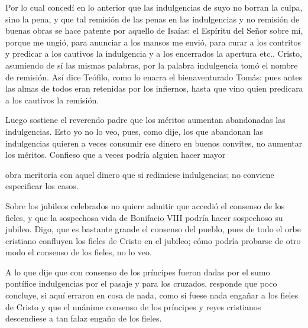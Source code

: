 Por lo cual concedí en lo anterior que las indulgencias de suyo no borran la culpa, sino la pena, y que tal remisión de las penas en las indulgencias y no remisión de buenas obras se hace patente por aquello de Isaías: el Espíritu del Señor sobre mí, porque me ungió, para anunciar a los mansos me envió, para curar a los contritos y predicar a los cautivos la indulgencia y a los encerrados la apertura etc.. Cristo, asumiendo de sí las mismas palabras, por la palabra indulgencia tomó el nombre de remisión. Así dice Teófilo, como lo enarra el bienaventurado Tomás: pues antes las almas de todos eran retenidas por los infiernos, hasta que vino quien predicara a los cautivos la remisión.

Luego sostiene el reverendo padre que los méritos aumentan abandonadas las indulgencias. Esto yo no lo veo, pues, como dije, los que abandonan las indulgencias quieren a veces consumir ese dinero en buenos convites, no aumentar los méritos. Confieso que a veces podría alguien hacer mayor

obra meritoria con aquel dinero que si redimiese indulgencias; no conviene especificar los casos.

Sobre los jubileos celebrados no quiere admitir que accedió el consenso de los fieles, y que la sospechosa vida de Bonifacio VIII podría hacer sospechoso su jubileo. Digo, que es bastante grande el consenso del pueblo, pues de todo el orbe cristiano confluyen los fieles de Cristo en el jubileo; cómo podría probarse de otro modo el consenso de los fieles, no lo veo.

A lo que dije que con consenso de los príncipes fueron dadas por el sumo pontífice indulgencias por el pasaje y para los cruzados, responde que poco concluye, si aquí erraron en cosa de nada, como si fuese nada engañar a los fieles de Cristo y que el unánime consenso de los príncipes y reyes cristianos descendiese a tan falaz engaño de los fieles.

